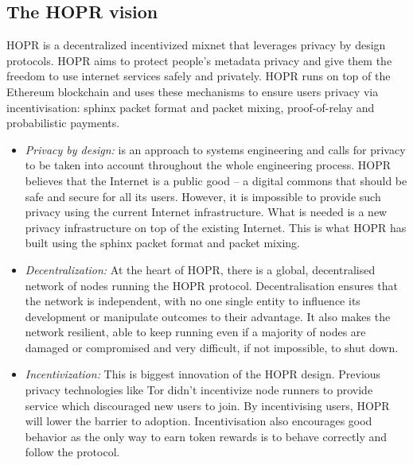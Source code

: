 \subsection{The HOPR vision}
HOPR is a decentralized incentivized mixnet that leverages privacy by design protocols. HOPR aims to protect people's metadata privacy and give them the freedom to use internet services safely and privately. HOPR runs on top of the Ethereum blockchain and uses these mechanisms to ensure users privacy via incentivisation: sphinx packet format and packet mixing, proof-of-relay and probabilistic payments.
\begin{itemize}
    \item \textit{Privacy by design:} is an approach to systems engineering and calls for privacy to be taken into account throughout the whole engineering process. HOPR believes that the Internet is a public good – a digital commons that should be safe and secure for all its users. However, it is impossible to provide such privacy using the current Internet infrastructure. What is needed is a new privacy infrastructure on top of the existing Internet. This is what HOPR has built using the sphinx packet format and packet mixing.
    \item \textit{Decentralization:} At the heart of HOPR, there is a global, decentralised network of nodes running the HOPR protocol. Decentralisation ensures that the network is independent, with no one single entity to influence its development or manipulate outcomes to their advantage. It also makes the network resilient, able to keep running even if a majority of nodes are damaged or compromised and very difficult, if not impossible, to shut down.
    \item \textit{Incentivization:} This is biggest innovation of the HOPR design. Previous privacy technologies like Tor didn't incentivize node runners to provide service which discouraged new users to join. By incentivising users, HOPR will lower the barrier to adoption. Incentivisation also encourages good behavior as the only way to earn token rewards is to behave correctly and follow the protocol.
    
\end{itemize}



 




